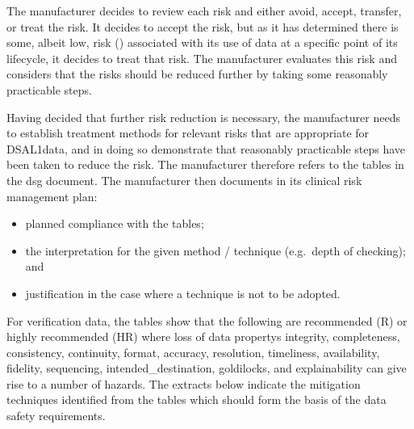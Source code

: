The manufacturer decides to review each risk and either avoid, accept, transfer, or \gls{treat} the risk. It decides to accept the  risk, but as it has determined there is some, albeit low, risk () associated with its use of data at a specific point of its lifecycle, it decides to \gls{treat} that risk. The manufacturer evaluates this risk and considers that the risks should be reduced further by taking some reasonably practicable steps.

Having decided that further risk reduction is necessary, the manufacturer needs to establish \gls{treatment} methods for relevant risks that are appropriate for DSAL1data, and in doing so demonstrate that reasonably practicable steps have been taken to reduce the risk. The manufacturer therefore refers to the tables in the \gls{dsg} document. The manufacturer then documents in its clinical risk management plan:

\begin{itemize}
  \item planned compliance with the tables;
  \item the interpretation for the given method / technique (e.g.\ depth of checking); and
  \item justification in the case where a technique is not to be adopted.
\end{itemize}

For  \gls{verification} data, the tables show that the following are recommended (R) or highly recommended (HR) where loss of \glspl{data property} 
	\gls{integrity},
	\gls{completeness}, 
	\gls{consistency},
	\gls{continuity},
	\gls{format},
	\gls{accuracy},
	\gls{resolution},
	\gls{timeliness},
	\gls{availability},
	\gls{fidelity},
	\gls{sequencing},
	\gls{intended_destination},
	\gls{goldilocks}, and
	\gls{explainability}
can give rise to
a number of \glspl{hazard}. The extracts below indicate the \gls{mitigation} techniques identified from the tables which should form the basis of the \glspl{data safety requirement}. 

